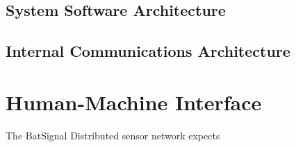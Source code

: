 \documentclass[11pt,a4paper]{article}
\begin{document}
\subsection{System Software Architecture}


\subsection{Internal Communications Architecture}

\section{Human-Machine Interface}
\textnormal{The BatSignal Distributed sensor network expects }
\end{document}
